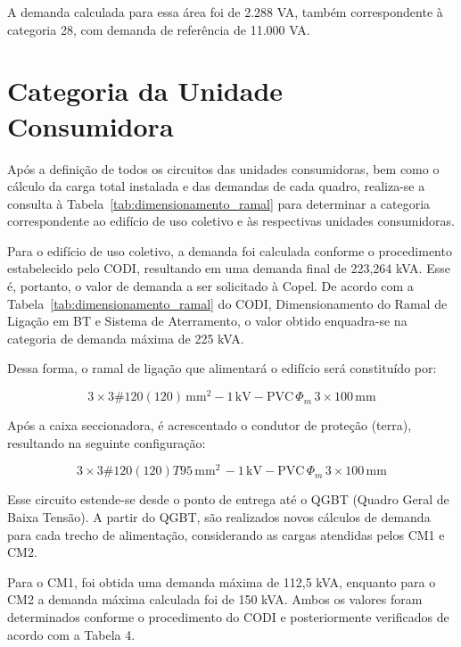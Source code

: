 \documentclass[12pt,openright,oneside,a4paper,brazil]{abntex2}
\begin{document}
A demanda calculada para essa área foi de 2.288 VA, também correspondente à categoria 28, com demanda de referência de 11.000 VA.

\section{Categoria da Unidade Consumidora}

\hspace{1.27cm}Após a definição de todos os circuitos das unidades consumidoras, bem como o cálculo da carga total instalada e das demandas de cada quadro, realiza-se a consulta à Tabela~\ref{tab:dimensionamento_ramal} para determinar a categoria correspondente ao edifício de uso coletivo e às respectivas unidades consumidoras.

Para o edifício de uso coletivo, a demanda foi calculada conforme o procedimento estabelecido pelo CODI, resultando em uma demanda final de 223,264 kVA. Esse é, portanto, o valor de demanda a ser solicitado à Copel. De acordo com a Tabela~\ref{tab:dimensionamento_ramal} do CODI, Dimensionamento do Ramal de Ligação em BT e Sistema de Aterramento, o valor obtido enquadra-se na categoria de demanda máxima de 225 kVA.

Dessa forma, o ramal de ligação que alimentará o edifício será constituído por:

\[3 \times 3\#120(120)\,\mathrm{mm}^2 - 1\,\mathrm{kV} - \mathrm{PVC}\,\Phi_m\,3 \times 100\,\mathrm{mm} \] \vspace{0.01px}

Após a caixa seccionadora, é acrescentado o condutor de proteção (terra), resultando na seguinte configuração:

\[3 \times 3\#120(120)T95\,\mathrm{mm}^2\,- 1\,\mathrm{kV} - \mathrm{PVC}\,\Phi_m\,3 \times 100\,\mathrm{mm} \] \vspace{0.01px}

Esse circuito estende-se desde o ponto de entrega até o QGBT (Quadro Geral de Baixa Tensão). A partir do QGBT, são realizados novos cálculos de demanda para cada trecho de alimentação, considerando as cargas atendidas pelos CM1 e CM2.

Para o CM1, foi obtida uma demanda máxima de 112,5 kVA, enquanto para o CM2 a demanda máxima calculada foi de 150 kVA. Ambos os valores foram determinados conforme o procedimento do CODI e posteriormente verificados de acordo com a Tabela 4.
\end{document}
